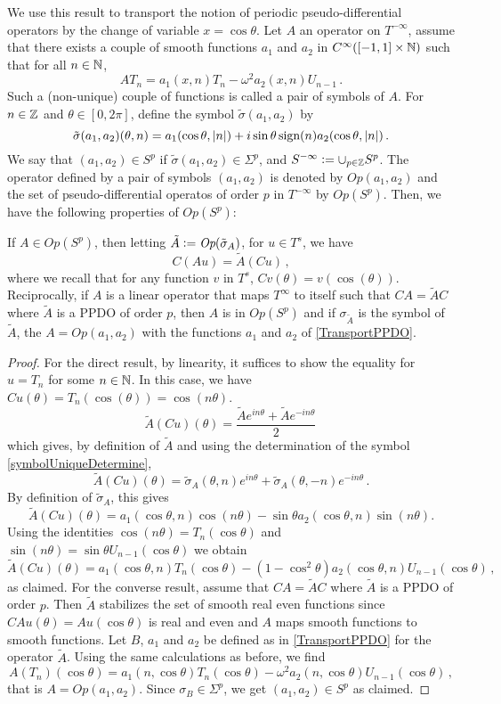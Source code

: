 \documentclass[a4paper]{article}
\begin{document}
We use this result to transport the notion of periodic pseudo-differential operators by the change of variable $x = \cos\theta$. Let $A$ an operator on $T^{-\infty}$, assume that there exists a couple of smooth functions $a_1$ and $a_2$ in $C^{\infty}([-1,1]\times \mathbb{N})$ such that for all $n \in \mathbb{N}$,
\[AT_n = a_1(x,n) T_n - \omega^2 a_2(x,n) U_{n-1}\,.\]
Such a (non-unique) couple of functions is called a pair of symbols of $A$. For $n\in \mathbb{Z}$ and $\theta \in [0,2\pi]$, define the symbol $\tilde{\sigma}(a_1,a_2)$ by
\[\tilde{\sigma}(a_1,a_2)(\theta,n) = a_1(\cos\theta,\left\lvert n \right\rvert) + i \sin\theta\,\text{sign}(n) a_2(\cos\theta,\left\lvert n \right\rvert)\,.\]
We say that $(a_1,a_2) \in S^p$ if $\tilde{\sigma}(a_1,a_2) \in \Sigma^p$, and $S^{-\infty} \mathrel{\mathop:}= \cup_{p \in \mathbb{Z}} S^p$. The operator defined by a pair of symbols $(a_1,a_2)$ is denoted by $\textit{Op}(a_1,a_2)$ and the set of pseudo-differential operatos of order $p$ in $T^{-\infty}$  by $\textit{Op}(S^p)$. 
Then, we have the following properties of $\textit{Op}(S^p)$:
\begin{Lem}
	If $A \in \textit{Op}(S^p)$, then letting $\tilde{A} \mathrel{\mathop:}= \textit{Op}(\tilde{\sigma}_A)$, for $u \in T^s$, we have 
	\[C(Au) = \tilde{A} (Cu)\,,\]
	where we recall that for any function $v$ in $T^s$, $Cv(\theta) = v(\cos(\theta))$. 
	Reciprocally, if $A$ is a linear operator that maps $T^\infty$ to itself such that
	$CA = \tilde{A}C$ where $\tilde{A}$ is a PPDO of order $p$, then $A$ is in $\textit{Op}(S^p)$ and if $\sigma_{\tilde{A}}$ is the symbol of $\tilde{A}$, the $A = \textit{Op}(a_1,a_2)$ with the functions $a_1$ and $a_2$ of \autoref{TransportPPDO}.
\end{Lem}
\begin{proof}
	For the direct result, by linearity, it suffices to show the equality for $u = T_n$ for some $n \in \mathbb{N}$. In this case, we have $Cu(\theta) = T_n(\cos(\theta)) = \cos(n\theta)$. 
	\[\tilde{A}\left(Cu\right)(\theta) = \frac{\tilde{A}e^{in\theta}+\tilde{A}e^{-in\theta}}{2}\,\]
	which gives, by definition of $\tilde{A}$ and using the determination of the symbol \eqref{symbolUniqueDetermine}, 
	\[\tilde{A}\left(Cu\right)(\theta) = \tilde{\sigma}_A(\theta,n)e^{in\theta} + \tilde{\sigma}_A(\theta,-n)e^{-in\theta}\,.\]
	By definition of $\tilde{\sigma}_A$, this gives 
	\[\tilde{A}\left(Cu\right)(\theta) = a_1(\cos\theta,n)\cos(n\theta) - \sin\theta a_2(\cos\theta,n)\sin(n\theta).\]
	Using the identities $\cos(n\theta) = T_n(\cos\theta)$ and $\sin(n\theta) = \sin\theta U_{n-1}(\cos\theta)$ we obtain
	\[\tilde{A}\left(Cu\right)(\theta) = a_1(\cos\theta,n)T_n(\cos\theta) - (1-\cos^2 \theta) a_2(\cos\theta,n) U_{n-1}(\cos\theta)\,,\]
	as claimed. 
	For the converse result, assume that $CA = \tilde{A}C$ where $\tilde{A}$ is a PPDO of order $p$. Then $\tilde{A}$ stabilizes the set of smooth real even functions since $CAu(\theta) = Au(\cos\theta)$ is real and even and $A$ maps smooth functions to smooth functions. Let $B$, $a_1$ and $a_2$ be defined as in \autoref{TransportPPDO} for the operator $\tilde{A}$. Using the same calculations as before, we find 
	\[A(T_n)(\cos \theta) = a_1(n,\cos\theta) T_n(\cos\theta) -\omega^2 a_2(n,\cos\theta) U_{n-1}(\cos\theta)\,,\]
	that is $A = \textit{Op}(a_1,a_2)$. Since $\sigma_B \in \Sigma^p$, we get $(a_1,a_2) \in S^p$ as claimed. 
\end{proof}
\end{document}
